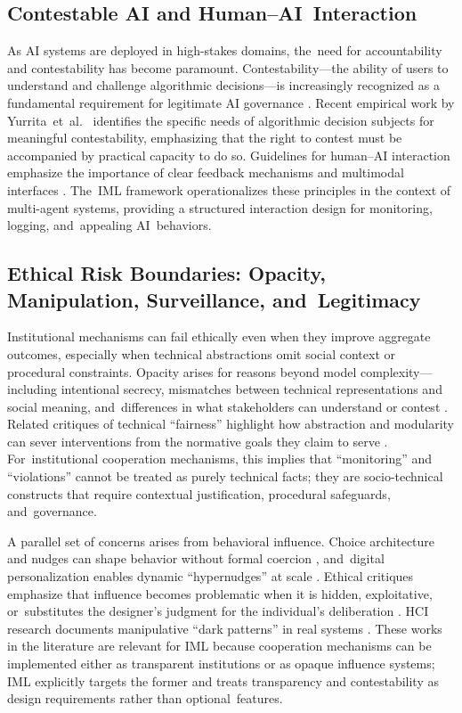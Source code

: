\documentclass[mca,article,accept,pdftex,oneauthor]{Definitions/mdpi}
\begin{document}
\subsection{Contestable AI and Human--AI~Interaction}

As AI systems are deployed in high-stakes domains, the~need for accountability and contestability has become paramount. Contestability---the ability of users to understand and challenge algorithmic decisions---is increasingly recognized as a fundamental requirement for legitimate AI governance \citep{Lyons2021Contestability}. Recent empirical work by Yurrita~et~al.~\citep{Yurrita2025Contestability} identifies the specific needs of algorithmic decision subjects for meaningful contestability, emphasizing that the right to contest must be accompanied by practical capacity to do so. Guidelines for human--AI interaction emphasize the importance of clear feedback mechanisms and multimodal interfaces \citep{Zhao2025HumanAI}. The~IML framework operationalizes these principles in the context of multi-agent systems, providing a structured interaction design for monitoring, logging, and~appealing AI~behaviors.

\subsection{Ethical Risk Boundaries: Opacity, Manipulation, Surveillance, and~Legitimacy}

Institutional mechanisms can fail ethically even when they improve aggregate outcomes, especially when technical abstractions omit social context or procedural constraints. Opacity arises for reasons beyond model complexity---including intentional secrecy, mismatches between technical representations and social meaning, and~differences in what stakeholders can understand or contest \citep{Burrell2016Opacity}. Related critiques of technical ``fairness'' highlight how abstraction and modularity can sever interventions from the normative goals they claim to serve \citep{Selbst2019FairnessAbstraction}. For~institutional cooperation mechanisms, this implies that ``monitoring'' and ``violations'' cannot be treated as purely technical facts; they are socio-technical constructs that require contextual justification, procedural safeguards, and~governance.

A parallel set of concerns arises from behavioral influence. Choice architecture and nudges can shape behavior without formal coercion \citep{ThalerSunstein2008}, and~digital personalization enables dynamic ``hypernudges'' at scale \citep{Yeung2017Hypernudge}. Ethical critiques emphasize that influence becomes problematic when it is hidden, exploitative, or~substitutes the designer’s judgment for the individual’s deliberation \citep{SusserRoesslerNissenbaum2019,HausmanWelch2010Nudge}. HCI research documents manipulative ``dark patterns'' in real systems \citep{Gray2018DarkPatterns,Mathur2019DarkPatternsScale}. These works in the literature are relevant for IML because cooperation mechanisms can be implemented either as transparent institutions or as opaque influence systems; IML explicitly targets the former and treats transparency and contestability as design requirements rather than optional~features.
\end{document}
